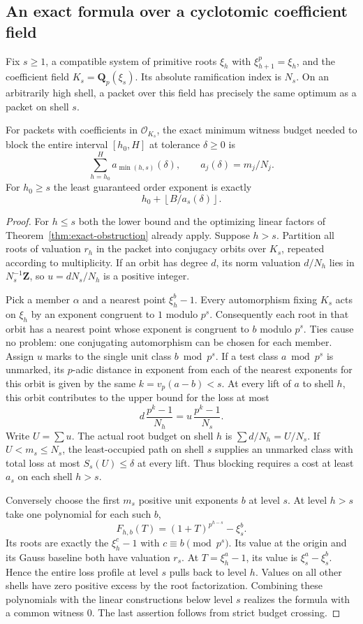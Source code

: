 \subsection*{An exact formula over a cyclotomic coefficient field}
Fix $s\ge1$, a compatible system of primitive roots $\xi_h$ with $\xi_{h+1}^p=\xi_h$, and the coefficient field $K_s=\mathbf Q_p(\xi_s)$. Its absolute ramification index is $N_s$. On an arbitrarily high shell, a packet over this field has precisely the same optimum as a packet on shell $s$.

\begin{theorem}\label{thm:descent}
For packets with coefficients in $\mathcal O_{K_s}$, the exact minimum witness budget needed to block the entire interval $[h_0,H]$ at tolerance $\delta\ge0$ is
\[
       \sum_{h=h_0}^H a_{\min(h,s)}(\delta),
       \qquad a_j(\delta)=m_j/N_j .
\]
For $h_0\ge s$ the least guaranteed order exponent is exactly
\[
        h_0+\left\lfloor B/a_s(\delta)\right\rfloor .
\]
\end{theorem}
\begin{proof}
For $h\le s$ both the lower bound and the optimizing linear factors of Theorem~\ref{thm:exact-obstruction} already apply. Suppose $h>s$. Partition all roots of valuation $r_h$ in the packet into conjugacy orbits over $K_s$, repeated according to multiplicity. If an orbit has degree $d$, its norm valuation $d/N_h$ lies in $N_s^{-1}\mathbf Z$, so $u=dN_s/N_h$ is a positive integer.

Pick a member $\alpha$ and a nearest point $\xi_h^b-1$. Every automorphism fixing $K_s$ acts on $\xi_h$ by an exponent congruent to $1$ modulo $p^s$. Consequently each root in that orbit has a nearest point whose exponent is congruent to $b$ modulo $p^s$. Ties cause no problem: one conjugating automorphism can be chosen for each member. Assign $u$ marks to the single unit class $b\bmod p^s$. If a test class $a\bmod p^s$ is unmarked, its $p$-adic distance in exponent from each of the nearest exponents for this orbit is given by the same $k=v_p(a-b)<s$. At every lift of $a$ to shell $h$, this orbit contributes to the upper bound for the loss at most
\[
             d\,\frac{p^k-1}{N_h}=u\,\frac{p^k-1}{N_s}.
\]
Write $U=\sum u$. The actual root budget on shell $h$ is $\sum d/N_h=U/N_s$. If $U<m_s\le N_s$, the least-occupied path on shell $s$ supplies an unmarked class with total loss at most $S_s(U)\le\delta$ at every lift. Thus blocking requires a cost at least $a_s$ on each shell $h>s$.

Conversely choose the first $m_s$ positive unit exponents $b$ at level $s$. At level $h>s$ take one polynomial for each such $b$,
\[
            F_{h,b}(T)=(1+T)^{p^{h-s}}-\xi_s^b.
\]
Its roots are exactly the $\xi_h^c-1$ with $c\equiv b\pmod {p^s}$. Its value at the origin and its Gauss baseline both have valuation $r_s$. At $T=\xi_h^a-1$, its value is $\xi_s^a-\xi_s^b$. Hence the entire loss profile at level $s$ pulls back to level $h$. Values on all other shells have zero positive excess by the root factorization. Combining these polynomials with the linear constructions below level $s$ realizes the formula with a common witness $0$. The last assertion follows from strict budget crossing.
\end{proof}
